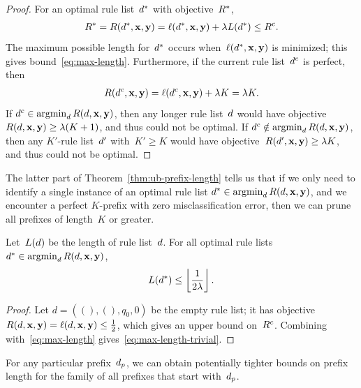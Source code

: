 \begin{proof}
For an optimal rule list~$d^*$ with objective~$R^*$,
\begin{align}
\OptimalObj = \Obj(\OptimalRL, \x, \y)
= \Loss(\OptimalRL, \x, \y) + \Reg L(\OptimalRL)
\le \CurrentObj.
\end{align}
The maximum possible length for~$d^*$ occurs
when~$\ell(d^*, \mathbf{x}, \mathbf{y})$ is minimized;
this gives bound~\eqref{eq:max-length}.
%
Furthermore, if the current rule list~$d^c$ is perfect, then
\begin{align}
\Obj(\CurrentRL, \x, \y) = \Loss(\CurrentRL, \x, \y) + \Reg K = \Reg K.
\end{align}
If ${d^c \in \operatorname*{argmin}_{d} R({d}, \mathbf{x}, \mathbf{y})}$, then any longer rule list~${d}$
would have objective~${R({d}, \mathbf{x}, \mathbf{y}) \ge {\lambda} (K+1)}$,
and thus could not be optimal.
%
If ${d^c \notin \operatorname*{argmin}_{d} R({d}, \mathbf{x}, \mathbf{y})}$, then any $K'$-rule list~${d}'$
with~${K' \ge K}$ would have objective~${R({d}', \mathbf{x}, \mathbf{y}) \ge {\lambda} K}$,
and thus could not be optimal.
\end{proof}

The latter part of Theorem~\ref{thm:ub-prefix-length} tells us that
if we only need to identify a single instance of an optimal rule list
${d^* \in \operatorname*{argmin}_{d} R({d}, \mathbf{x}, \mathbf{y})}$, and we encounter a perfect
$K$-prefix with zero misclassification error, then we can prune all
prefixes of length~$K$ or greater.

\begin{corollary}
Let~$L({d})$ be the length of rule list~${d}$.
%
For all optimal rule lists ${d^* \in \operatorname*{argmin}_{d} R({d}, \mathbf{x}, \mathbf{y})}$,
\begin{align}
L(\OptimalRL) \le \left\lfloor \frac{1}{2\Reg} \right\rfloor.
\label{eq:max-length-trivial}
\end{align}
\end{corollary}

\begin{proof}
Let ${d = ((), (), q_0, 0)}$ be the empty rule list;
it has objective ${R({d}, \mathbf{x}, \mathbf{y}) = \ell({d}, \mathbf{x}, \mathbf{y}) \le \frac{1}{2}}$,
which gives an upper bound on~$R^c$.
%
Combining with~\eqref{eq:max-length} gives~\eqref{eq:max-length-trivial}.
\end{proof}

For any particular prefix~$d_p$, we can obtain potentially tighter bounds on
prefix length for the family of all prefixes that start with~$d_p$.

